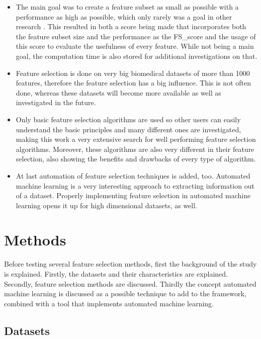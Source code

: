 \documentclass[10pt,a4paper]{report}
\begin{document}
	\begin{itemize}
	\item	The main goal was to create a feature subset as small as possible with a performance as high as possible, which only rarely was a goal in other research \cite{prados2004mining}. This resulted in both a score being made that incorporates both the feature subset size and the performance as the FS\_score and the usage of this score to evaluate the usefulness of every feature. While not being a main goal, the computation time is also stored for additional investigations on that.
	\item	Feature selection is done on very big biomedical datasets of more than 1000 features, therefore the feature selection has a big influence. This is not often done, whereas these datasets will become more available as well as investigated in the future.
	\item	Only basic feature selection algorithms are used so other users can easily understand the basic principles and many different ones are investigated, making this work a very extensive search for well performing feature selection algorithms. Moreover, these algorithms are also very different in their feature selection, also showing the benefits and drawbacks of every type of algorithm.
	\item	At last automation of feature selection techniques is added, too. Automated machine learning is a very interesting approach to extracting information out of a dataset. Properly implementing feature selection in automated machine learning opens it up for high dimensional datasets, as well.
	\end{itemize}
	
	
	\section{Methods}
	\label{FSsec:Background}
	
	Before testing several feature selection methods, first the background of the study is explained. Firstly, the datasets and their characteristics are explained. Secondly, feature selection methods are discussed. Thirdly the concept automated machine learning is discussed as a possible technique to add to the framework, combined with a tool that implements automated machine learning.
	
	\subsection{Datasets}
	\label{FSsubsec:Datasets}
	
\end{document}
